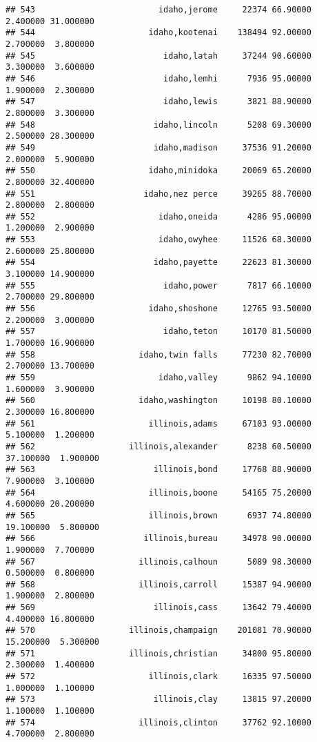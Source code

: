 \documentclass[
]{article}
\begin{document}
\begin{verbatim}
## 543                         idaho,jerome     22374 66.90000  2.400000 31.000000
## 544                       idaho,kootenai    138494 92.00000  2.700000  3.800000
## 545                          idaho,latah     37244 90.60000  3.300000  3.600000
## 546                          idaho,lemhi      7936 95.00000  1.900000  2.300000
## 547                          idaho,lewis      3821 88.90000  2.800000  3.300000
## 548                        idaho,lincoln      5208 69.30000  2.500000 28.300000
## 549                        idaho,madison     37536 91.20000  2.000000  5.900000
## 550                       idaho,minidoka     20069 65.20000  2.800000 32.400000
## 551                      idaho,nez perce     39265 88.70000  2.800000  2.800000
## 552                         idaho,oneida      4286 95.00000  1.200000  2.900000
## 553                         idaho,owyhee     11526 68.30000  2.600000 25.800000
## 554                        idaho,payette     22623 81.30000  3.100000 14.900000
## 555                          idaho,power      7817 66.10000  2.700000 29.800000
## 556                       idaho,shoshone     12765 93.50000  2.200000  3.000000
## 557                          idaho,teton     10170 81.50000  1.700000 16.900000
## 558                     idaho,twin falls     77230 82.70000  2.700000 13.700000
## 559                         idaho,valley      9862 94.10000  1.600000  3.900000
## 560                     idaho,washington     10198 80.10000  2.300000 16.800000
## 561                       illinois,adams     67103 93.00000  5.100000  1.200000
## 562                   illinois,alexander      8238 60.50000 37.100000  1.900000
## 563                        illinois,bond     17768 88.90000  7.900000  3.100000
## 564                       illinois,boone     54165 75.20000  4.600000 20.200000
## 565                       illinois,brown      6937 74.80000 19.100000  5.800000
## 566                      illinois,bureau     34978 90.00000  1.900000  7.700000
## 567                     illinois,calhoun      5089 98.30000  0.500000  0.800000
## 568                     illinois,carroll     15387 94.90000  1.900000  2.800000
## 569                        illinois,cass     13642 79.40000  4.400000 16.800000
## 570                   illinois,champaign    201081 70.90000 15.200000  5.300000
## 571                   illinois,christian     34800 95.80000  2.300000  1.400000
## 572                       illinois,clark     16335 97.50000  1.000000  1.100000
## 573                        illinois,clay     13815 97.20000  1.100000  1.100000
## 574                     illinois,clinton     37762 92.10000  4.700000  2.800000

\end{verbatim}
\end{document}
